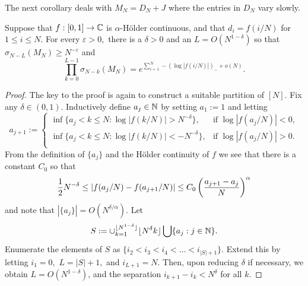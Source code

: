 \documentclass{amsart}
\numberwithin{equation}{section}
\def\corAB{}
\def\corOZ{}
\def\corABrev{\textcolor{black}}
\begin{document}
The next corollary deals with $M_N=D_N+J$ where the entries in $D_N$
vary slowly.
  \begin{corollary}
    \label{cor:holderssv} Suppose that
    $f : [0,1] \to \mathbb{C}$ is \corAB{$\alpha$}-H\"older continuous,
    and that $d_i = f(i/N)$ for $1 \leq i \leq N.$
    For every $\varepsilon > 0,$ there is a $\delta >0$ and an
    $\corAB{L = O(N^{1-\delta})}$ so that
  \(
  \sigma_{N-\corAB{L}}(M_N) \geq N^{-\varepsilon}
  \)
  and
  \[
    \prod_{k=0}^{\corAB{L}-1} \sigma_{N-k}(M_N) = e^{\sum_{i=1}^N -(\log |f(i/N)|)_{-} + o(N)}.
  \]
  \end{corollary}
  \begin{proof}
  \corAB{The key to the proof is again to construct a suitable partition of $[N]$. Fix any $\delta  \in (0,1)$.} Inductively define $a_j \in \mathbb N$ by setting $a_1:=1$ and letting
  \[
    a_{j+1} := \begin{cases}
      \inf\{ a_j < k \leq N : \log |f(k/N)| > N^{-\delta} \}, &\text{if } \log |f(a_j/N)| < 0, \\
      \inf\{ a_j < k \leq N : \log |f(k/N)| < -N^{-\delta} \}, &\text{if } \log |f(a_j/N)| > 0. \\
    \end{cases}
  \]
 \corAB{From the definition of $\{a_j\}$ and the H\"older continuity of $f$ we see that} there is \corAB{a constant $C_0$} so that
 \[
\corABrev{\frac12} N^{-\delta} \leq |f(a_j/N) - f(a_{j+1}/N)| \leq \corAB{C_0}\left(\frac{a_{j+1}-a_j}{N}\right)^{\alpha}
 \]
 \corAB{and note that $|\{a_j\}| = O(N^{\delta/\alpha})$}.
 Let
 \[
   S := \cup_{k=1}^{\lfloor N^{1-\delta}\rfloor } \lfloor N^\delta k\rfloor \bigcup \{a_j: j \in \mathbb N\}.
 \]
 Enumerate the elements of $S$ as $\{ i_2 < i_3 < i_4 < \dots < i_{|S|+1} \}.$  Extend this by letting $i_1 =0,$ $\corOZ{L}= |S|+1,$ and $i_{\corOZ{L}+1}=N.$  \corAB{Then, upon reducing $\delta$ if necessary, we obtain $L = O(N^{1-\delta})$}, and the separation $i_{k+1} - i_k < N^{\delta}$ for all $k$.


\end{proof}
\end{document}
